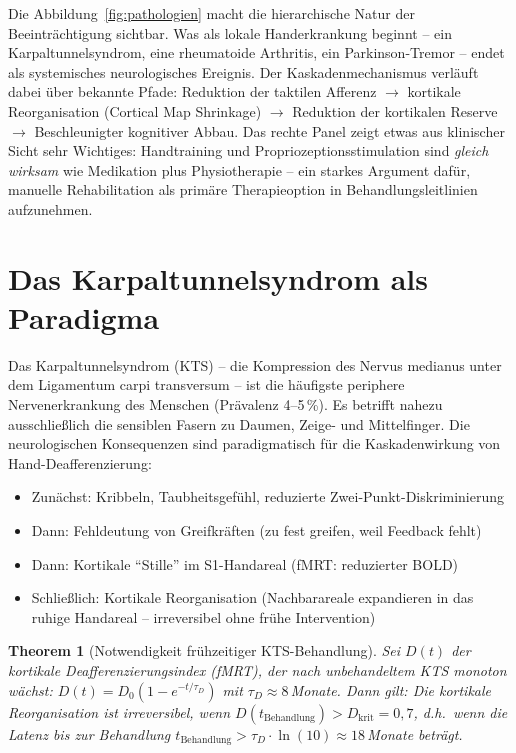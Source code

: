 ﻿\documentclass[12pt,a4paper]{report}
\theoremstyle{plain}
\newtheorem{theorem}{Theorem}[section]
\theoremstyle{definition}
\theoremstyle{remark}
\begin{document}
Die Abbildung~\ref{fig:pathologien} macht die hierarchische Natur der Beeinträchtigung
sichtbar. Was als lokale Handerkrankung beginnt -- ein Karpaltunnelsyndrom,
eine rheumatoide Arthritis, ein Parkinson-Tremor -- endet als systemisches
neurologisches Ereignis. Der Kaskadenmechanismus verläuft dabei über bekannte
Pfade: Reduktion der taktilen Afferenz $\to$ kortikale Reorganisation
(Cortical Map Shrinkage) $\to$ Reduktion der kortikalen Reserve $\to$
Beschleunigter kognitiver Abbau. Das rechte Panel zeigt etwas aus klinischer
Sicht sehr Wichtiges: Handtraining und Propriozeptionsstimulation sind
\emph{gleich wirksam} wie Medikation plus Physiotherapie -- ein starkes
Argument dafür, manuelle Rehabilitation als primäre Therapieoption in
Behandlungsleitlinien aufzunehmen.

\section{Das Karpaltunnelsyndrom als Paradigma}

Das Karpaltunnelsyndrom (KTS) -- die Kompression des Nervus medianus unter
dem Ligamentum carpi transversum -- ist die häufigste periphere Nervenerkrankung
des Menschen (Prävalenz 4--5\,\%). Es betrifft nahezu ausschließlich die
sensiblen Fasern zu Daumen, Zeige- und Mittelfinger. Die neurologischen
Konsequenzen sind paradigmatisch für die Kaskadenwirkung von Hand-Deafferenzierung:

\begin{itemize}
\item Zunächst: Kribbeln, Taubheitsgefühl, reduzierte Zwei-Punkt-Diskriminierung
\item Dann: Fehldeutung von Greifkräften (zu fest greifen, weil Feedback fehlt)
\item Dann: Kortikale ``Stille'' im S1-Handareal (fMRT: reduzierter BOLD)
\item Schließlich: Kortikale Reorganisation (Nachbarareale expandieren in
  das ruhige Handareal -- irreversibel ohne frühe Intervention)
\end{itemize}

\begin{theorem}[Notwendigkeit frühzeitiger KTS-Behandlung]
\label{thm:kts}
Sei $D(t)$ der kortikale Deafferenzierungsindex (fMRT), der nach unbehandeltem
KTS monoton wächst: $D(t) = D_0(1 - e^{-t/\tau_D})$ mit $\tau_D \approx 8$\,Monate.
Dann gilt: Die kortikale Reorganisation ist irreversibel, wenn
$D(t_{\text{Behandlung}}) > D_{\text{krit}} = 0{,}7$, d.h.\ wenn die
Latenz bis zur Behandlung $t_{\text{Behandlung}} > \tau_D \cdot \ln(10) \approx 18$\,Monate
beträgt.
\end{theorem}
\end{document}
